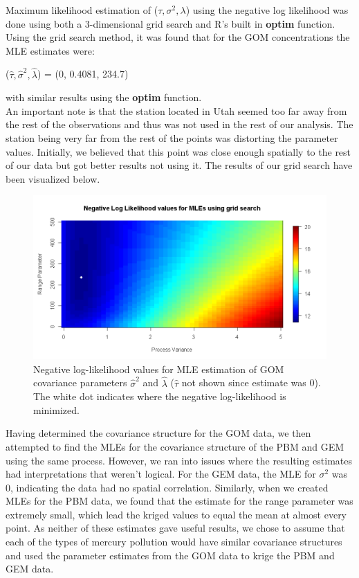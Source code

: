 \documentclass[12pt,a4]{article}
\theoremstyle{plain} %
\begin{document}
Maximum likelihood estimation of ($\tau, \sigma^2, \lambda$) using the negative log likelihood was done using both a 3-dimensional grid search and R's built in \textbf{optim} function. Using the grid search method, it was found that for the GOM concentrations the MLE estimates were: 
\begin{center}
($\hat{\tau},\hat{\sigma}^2,\hat{\lambda}$) = (0, 0.4081, 234.7) 
\end{center}
with similar results using the \textbf{optim} function. \\
An important note is that the station located in Utah seemed too far away from the rest of the observations and thus was not used in the rest of our analysis. The station being very far from the rest of the points was distorting the parameter values. Initially, we believed that this point was close enough spatially to the rest of our data but got better results not using it. The results of our grid search have been visualized below.
\begin{figure}[H]
    \centering
    \includegraphics[width=0.7\linewidth]{GOM_gridsearch.png}
    \caption{Negative log-likelihood values for MLE estimation of GOM covariance parameters $\hat{\sigma}^2$ and $\hat{\lambda}$ ($\hat{\tau}$ not shown since estimate was 0). The white dot indicates where the negative log-likelihood is minimized.}
\end{figure}
Having determined the covariance structure for the GOM data, we then attempted to find the MLEs for the covariance structure of the PBM and GEM using the same process. However, we ran into issues where the resulting estimates had interpretations that weren't logical. For the GEM data, the MLE for $\sigma^2$ was 0, indicating the data had no spatial correlation. Similarly, when we created MLEs for the PBM data, we found that the estimate for the range parameter was extremely small, which lead the kriged values to equal the mean at almost every point. As neither of these estimates gave useful results, we chose to assume that each of the types of mercury pollution would have similar covariance structures and used the parameter estimates from the GOM data to krige the PBM and GEM data. \\
\end{document}
